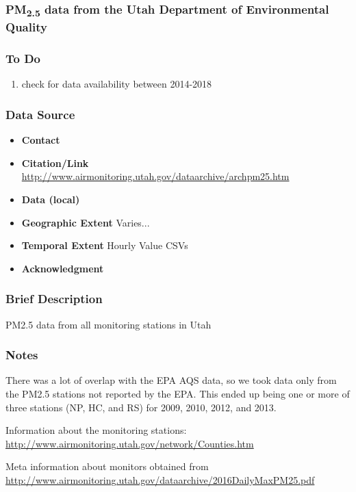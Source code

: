 \subsubsection{\texorpdfstring{PM\textsubscript{2.5}}{} data from the Utah Department of Environmental Quality }

\subsubsection*{To Do}
\begin{enumerate}
\item check for data availability between 2014-2018
\end{enumerate}

\subsubsection*{Data Source}

\begin{itemize}[nolistsep]
\item \textbf{Contact} 
\item \textbf{Citation/Link} \url{http://www.airmonitoring.utah.gov/dataarchive/archpm25.htm}
\item \textbf{Data (local)} 
\item \textbf{Geographic Extent} Varies... 
\item \textbf{Temporal Extent} Hourly Value CSVs
\item \textbf{Acknowledgment} 
\end{itemize}

\subsubsection*{Brief Description} 
PM2.5 data from all monitoring stations in Utah

\subsubsection*{Notes} 
There was a lot of overlap with the EPA AQS data, so we took data only from the PM2.5 stations not reported by the EPA. 
This ended up being one or more of three stations (NP, HC, and RS) for 2009, 2010, 2012, and 2013.

Information about the monitoring stations: \url{ http://www.airmonitoring.utah.gov/network/Counties.htm } 

Meta information about monitors obtained from \url{http://www.airmonitoring.utah.gov/dataarchive/2016DailyMaxPM25.pdf}

